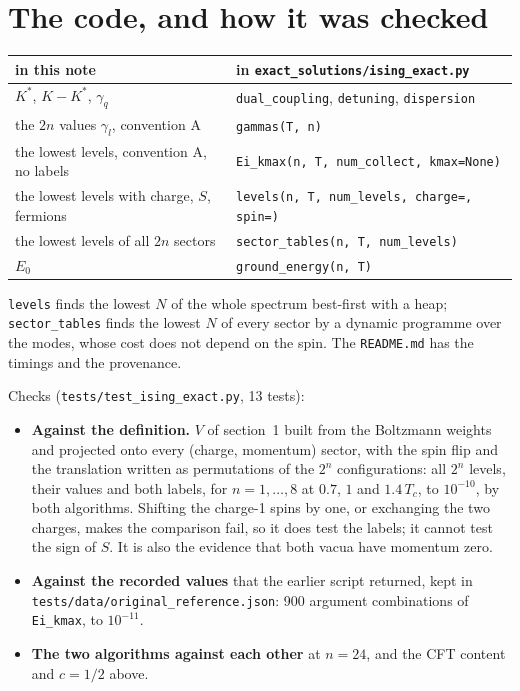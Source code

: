 \documentclass[11pt]{article}
\newcommand\code[1]{\texttt{#1}}
\begin{document}
\section{The code, and how it was checked}

\begin{center}\begin{tabular}{ll}
\toprule
in this note & in \code{exact\_solutions/ising\_exact.py} \\
\midrule
$K^*$, $K - K^*$, $\gamma_q$ & \code{dual\_coupling}, \code{detuning}, \code{dispersion} \\
the $2n$ values $\gamma_l$, convention A & \code{gammas(T, n)} \\
the lowest levels, convention A, no labels & \code{Ei\_kmax(n, T, num\_collect, kmax=None)} \\
the lowest levels with charge, $S$, fermions & \code{levels(n, T, num\_levels, charge=, spin=)} \\
the lowest levels of all $2n$ sectors & \code{sector\_tables(n, T, num\_levels)} \\
$E_0$ & \code{ground\_energy(n, T)} \\
\bottomrule
\end{tabular}\end{center}

\code{levels} finds the lowest $N$ of the whole spectrum best-first with a heap;
\code{sector\_tables} finds the lowest $N$ of every sector by a dynamic programme over the modes,
whose cost does not depend on the spin.  The \code{README.md} has the timings and the
provenance.

Checks (\code{tests/test\_ising\_exact.py}, 13 tests):
\begin{itemize}
\item \textbf{Against the definition.}  $V$ of section~1 built from the Boltzmann weights and
  projected onto every (charge, momentum) sector, with the spin flip and the translation written
  as permutations of the $2^n$ configurations: all $2^n$ levels, their values and both labels,
  for $n = 1, \dots, 8$ at $0.7$, $1$ and $1.4\,T_c$, to $10^{-10}$, by both algorithms.
  Shifting the charge-1 spins by one, or exchanging the two charges, makes the comparison fail,
  so it does test the labels; it cannot test the sign of $S$.  It is also the evidence that both
  vacua have momentum zero.
\item \textbf{Against the recorded values} that the earlier script returned, kept in
  \code{tests/\allowbreak{}data/\allowbreak{}original\_reference.json}: 900 argument
  combinations of \code{Ei\_kmax}, to $10^{-11}$.
\item \textbf{The two algorithms against each other} at $n = 24$, and the CFT content and
  $c = 1/2$ above.
\end{itemize}
\end{document}
